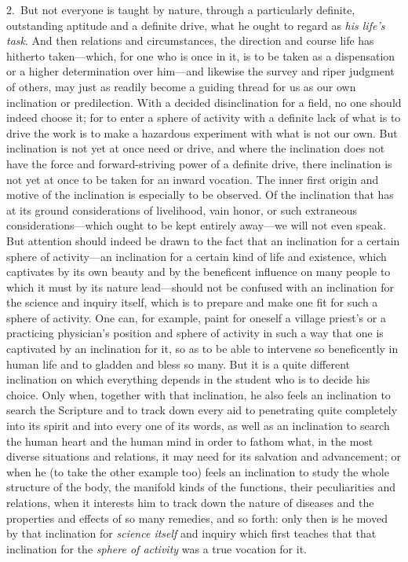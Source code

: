 \documentclass[12pt,a4paper]{book}
\begin{document}
2.~But not everyone is taught by nature, through a particularly definite, outstanding
aptitude and a definite drive, what he ought to regard as \emph{his life's task}. And
then relations and circumstances, the direction and course life has hitherto
taken---which, for one who is once in it, is to be taken as a dispensation or a higher
determination over him---and likewise the survey and riper judgment of others, may just
as readily become a guiding thread for us as our own inclination or predilection. With
a decided disinclination for a field, no one should indeed choose it; for to enter a
sphere of activity with a definite lack of what is to drive the work is to make a
hazardous experiment with what is not our own. But inclination is not yet at once need
or drive, and where the inclination does not have the force and forward-striving power
of a definite drive, there inclination is not yet at once to be taken for an inward
vocation. The inner first origin and motive of the inclination is especially to be
observed. Of the inclination that has at its ground considerations of livelihood, vain
honor, or such extraneous considerations---which ought to be kept entirely away---we
will not even speak. But attention should indeed be drawn to the fact that an inclination
for a certain sphere of activity---an inclination for a certain kind of life and
existence, which captivates by its own beauty and by the beneficent influence on many
people to which it must by its nature lead---should not be confused with an inclination
for the science and inquiry itself, which is to prepare and make one fit for such a
sphere of activity. One can, for example, paint for oneself a village priest's or a
practicing physician's position and sphere of activity in such a way that one is
captivated by an inclination for it, so as to be able to intervene so beneficently in
human life and to gladden and bless so many. But it is a quite different inclination on
which everything depends in the student who is to decide his choice. Only when, together
with that inclination, he also feels an inclination to search the Scripture and to track
down every aid to penetrating quite completely into its spirit and into every one of its
words, as well as an inclination to search the human heart and the human mind in order
to fathom what, in the most diverse situations and relations, it may need for its
salvation and advancement; or when he (to take the other example too) feels an
inclination to study the whole structure of the body, the manifold kinds of the
functions, their peculiarities and relations, when it interests him to track down the
nature of diseases and the properties and effects of so many remedies, and so forth:
only then is he moved by that inclination for \emph{science itself} and inquiry which
first teaches that that inclination for the \emph{sphere of activity} was a true
vocation for it.
\end{document}
